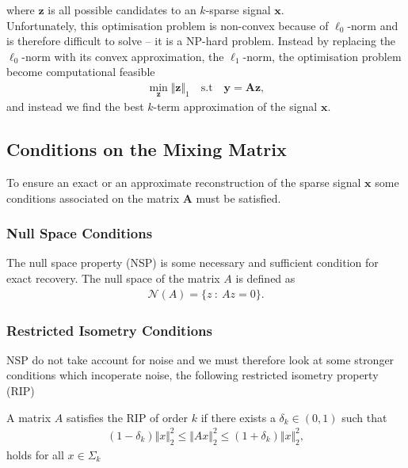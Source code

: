 where $\mathbf{z}$ is all possible candidates to an $k$-sparse signal $\mathbf{x}$.
\\
Unfortunately, this optimisation problem is non-convex because of $\ell_0$-norm and is therefore difficult to solve -- it is a NP-hard problem. Instead by replacing the $\ell_0$-norm with its convex approximation, the $\ell_1$-norm, the optimisation problem become computational feasible \cite[p. 27]{CS}
\begin{align}\label{eq:p1}
\min_{\mathbf{z}} \Vert \mathbf{z} \Vert_1 \quad \text{s.t} \quad \mathbf{y} = \mathbf{Az},
\end{align} 
and instead we find the best $k$-term approximation of the signal $\mathbf{x}$.

\subsection{Conditions on the Mixing Matrix}
To ensure an exact or an approximate reconstruction of the sparse signal $\mathbf{x}$ some conditions associated on the matrix $\mathbf{A}$ must be satisfied.

\subsubsection{Null Space Conditions}
The null space property (NSP) is some necessary and sufficient condition for exact recovery.
The null space of the matrix $A$ is defined as
\begin{align*}
\mathcal{N}(A) = \{ z \ : \ Az = 0 \}.
\end{align*} 





\subsubsection{Restricted Isometry Conditions}
NSP do not take account for noise and we must therefore look at some stronger conditions which incoperate noise, the following restricted isometry property (RIP) %

\begin{definition}
A matrix $A$ satisfies the RIP of order $k$ if there exists a $\delta_k \in (0,1)$ such that
\begin{align*}
(1 - \delta_k) \Vert x \Vert_2^2 \leq \Vert Ax \Vert_2^2 \leq (1 + \delta_k) \Vert x \Vert_2^2,
\end{align*}
holds for all $x \in \Sigma_k$
\end{definition}


